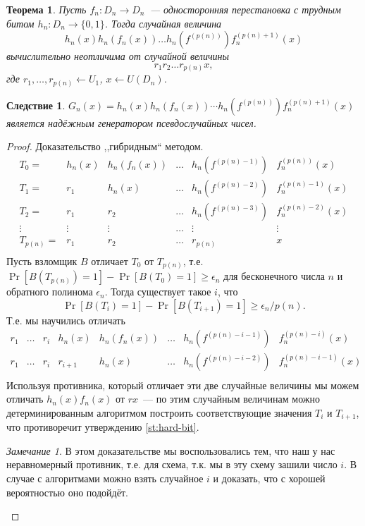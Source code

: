 \documentclass[12pt,a4paper]{article}
\newcommand{\bits}{\{0,1\}}
\theoremstyle{definition}
\theoremstyle{plain}
\newtheorem{theorem}{Теорема}[section]
\newtheorem{corollary}{Следствие}[section]
\theoremstyle{remark}
\newtheorem{remark}{Замечание}[section]
\begin{document}
\begin{theorem}
Пусть $f_n:D_n\to D_n$~--- односторонняя перестановка с трудным битом $h_n: D_n\to\bits$.
Тогда случайная величина 
$$h_n(x)h_n(f_n(x))\dotsc h_n(f^{(p(n))})f_n^{(p(n) + 1)}(x)$$
вычислительно неотличима от случайной величины 
$$r_1r_2\dotsc r_{p(n)}x,$$
где $r_1,\dotsc,r_{p(n)}\gets U_1$, $x\gets U(D_n)$.
\end{theorem}
\begin{corollary}
$G_n(x) = h_n(x)h_n(f_n(x))\dotsb h_n(f^{(p(n))})f_n^{(p(n) + 1)}(x)$ является надёжным генератором псевдослучайных чисел.
\end{corollary}
\begin{proof}
Доказательство ,,гибридным`` методом.
$$
\begin{array}{llllll}
T_0 = & h_n(x)&h_n(f_n(x))&\dotsc  &h_n(f^{(p(n)-1)})  &f_n^{(p(n))}(x)\\
T_1 = &r_1   &h_n(x)     &\dotsc  &h_n(f^{(p(n)-2)})&f_n^{(p(n)-1)}(x)\\
T_2 = &r_1   &r_2        &\dotsc  &h_n(f^{(p(n)-3)})&f_n^{(p(n)-2)}(x)\\
\vdots   &\vdots&\vdots     &\dotsc  &\vdots			 &\vdots\\
T_{p(n)}= &r_1   &r_2        &\dotsc  &r_{p(n)}		 &x\\
\end{array}
$$
Пусть взломщик $B$ отличает $T_0$ от $T_{p(n)}$, т.е. $\Pr[B(T_{p(n)}) = 1] - \Pr[B(T_0) = 1]\ge\epsilon_n$
для бесконечного числа $n$ и обратного полинома $\epsilon_n$. Тогда существует такое $i$, что
$$\Pr[B(T_i) = 1] - \Pr[B(T_{i+1}) = 1]\ge\epsilon_n/p(n).$$ Т.е. мы научились отличать
$$
\begin{array}{llllllll}
r_1   &\dotsc & r_i & h_n(x)  & h_n(f_n(x)) &\dotsc& h_n(f^{(p(n)-i - 1)})    &f_n^{(p(n) - i)}(x)\\
r_1   &\dotsc & r_i & r_{i+1} & h_n(x)      &\dotsc& h_n(f^{(p(n)-i - 2)})&f_n^{(p(n) - i - 1)}(x)\\
\end{array}
$$
Используя противника, который отличает эти две случайные величины мы можем отличать $h_n(x)f_n(x)$ от $r x$~---
по этим случайным величинам можно детерминированным алгоритмом построить соответствующие значения $T_{i}$ и $T_{i+1}$, что противоречит утверждению \ref{st:hard-bit}.

\begin{remark}
В этом доказательстве мы воспользовались тем, что наш у нас неравномерный противник, т.е. для схема,
т.к. мы в эту схему зашили число $i$. В случае с алгоритмами можно взять случайное $i$ и доказать, 
что с хорошей вероятностью оно подойдёт.
\end{remark}
\end{proof}
\end{document}
